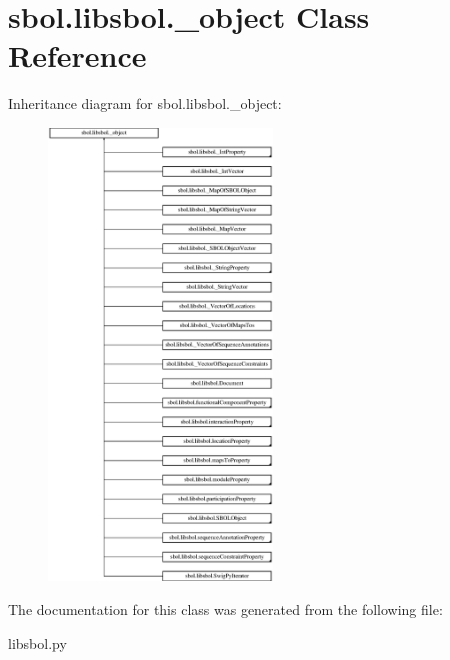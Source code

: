 \hypertarget{classsbol_1_1libsbol_1_1__object}{}\section{sbol.\+libsbol.\+\_\+object Class Reference}
\label{classsbol_1_1libsbol_1_1__object}
Inheritance diagram for sbol.\+libsbol.\+\_\+object\+:\begin{figure}[H]
\begin{center}
\leavevmode
\includegraphics[height=12.000000cm]{classsbol_1_1libsbol_1_1__object}
\end{center}
\end{figure}


The documentation for this class was generated from the following file\+:\begin{DoxyCompactItemize}
\item 
libsbol.\+py\end{DoxyCompactItemize}
